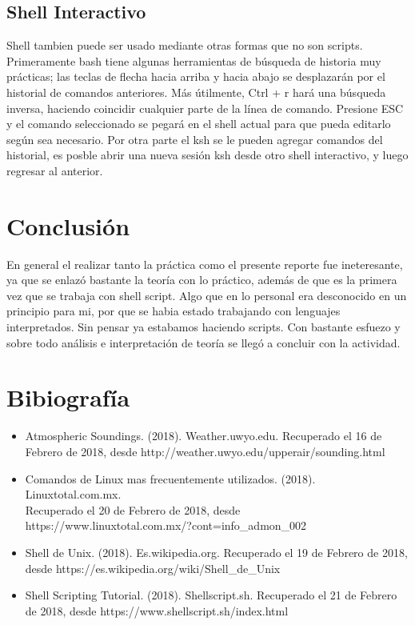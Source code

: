 \documentclass[12pt]{article}
\begin{document}
\subsection*{Shell Interactivo}

Shell tambien puede ser usado mediante otras formas que no son scripts. Primeramente bash tiene algunas herramientas de búsqueda de historia muy prácticas; las teclas de flecha hacia arriba y hacia abajo se desplazarán por el historial de comandos anteriores. Más útilmente, Ctrl + r hará una búsqueda inversa, haciendo coincidir cualquier parte de la línea de comando. Presione ESC y el comando seleccionado se pegará en el shell actual para que pueda editarlo según sea necesario. Por otra parte el ksh se le pueden agregar comandos del historial, es posble abrir una nueva sesión ksh desde otro shell interactivo, y luego regresar al anterior.

\section*{Conclusión}
En general el realizar tanto la práctica como el presente reporte fue ineteresante, ya que se enlazó bastante la teoría con lo práctico, además de que es la primera vez que se trabaja con shell script. Algo que en lo personal era desconocido en un principio para mi, por que se habia estado trabajando con lenguajes interpretados. Sin pensar ya estabamos haciendo scripts. Con bastante esfuezo y sobre todo análisis e interpretación de teoría se llegó a concluir con la actividad.

\section*{Bibiografía}
\begin{itemize}
\item Atmospheric Soundings. (2018). Weather.uwyo.edu. Recuperado el 16 de Febrero de 2018, desde http://weather.uwyo.edu/upperair/sounding.html
\item  Comandos de Linux mas frecuentemente utilizados. (2018). Linuxtotal.com.mx. \\Recuperado el 20 de Febrero de 2018, desde \\https://www.linuxtotal.com.mx/?cont=info\_admon\_002
\item  Shell de Unix. (2018). Es.wikipedia.org. Recuperado el 19 de Febrero de 2018, desde https://es.wikipedia.org/wiki/Shell\_de\_Unix
\item  Shell Scripting Tutorial. (2018). Shellscript.sh. Recuperado el 21 de Febrero de 2018, desde https://www.shellscript.sh/index.html
\end{itemize}
\newpage
\end{document}
